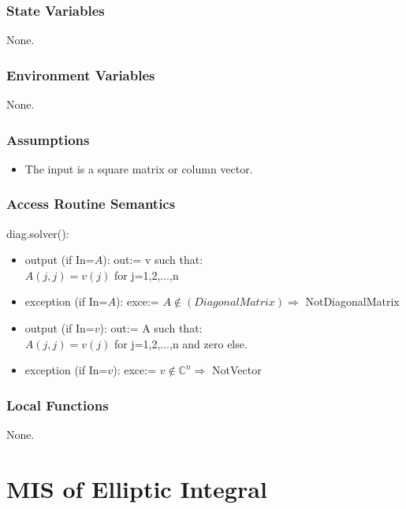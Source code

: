 \documentclass[12pt, titlepage]{article}
\begin{document}
\subsubsection{State Variables}

None.

\subsubsection{Environment Variables}

None.

\subsubsection{Assumptions}

\begin{itemize}
	\item The input is a square matrix or column vector.  
\end{itemize}

\subsubsection{Access Routine Semantics}

\noindent diag.solver():
\begin{itemize}
	\item output (if In=$A$): out:= v such that:\\
	$A(j,j) = v(j)$ for j=1,2,...,n \\
	\item exception (if In=$A$): exce:= $A \not\in (Diagonal Matrix) 
	\Rightarrow$ 
	NotDiagonalMatrix 
	\item output (if In=$v$): out:= A such that:\\
	$A(j,j) = v(j)$ for j=1,2,...,n and zero else. \\
	\item exception (if In=$v$): exce:= $v \not\in \mathbb{C}^{n} \Rightarrow$ 
	NotVector 
\end{itemize} 

\subsubsection{Local Functions} 

None. 

\newpage 

\section{MIS of Elliptic Integral} \label{MEI}
\end{document}
